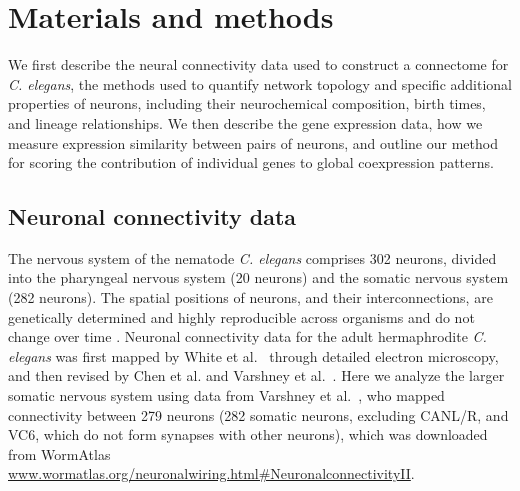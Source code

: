 \documentclass[10pt,letterpaper]{article}
\begin{document}
\section*{Materials and methods}

We first describe the neural connectivity data used to construct a connectome for \textit{C. elegans}, the methods used to quantify network topology and specific additional properties of neurons, including their neurochemical composition, birth times, and lineage relationships.
We then describe the gene expression data, how we measure expression similarity between pairs of neurons, and outline our method for scoring the contribution of individual genes to global coexpression patterns.


\subsection*{Neuronal connectivity data}
The nervous system of the nematode \emph{C. elegans} comprises 302 neurons, divided into the pharyngeal nervous system (20 neurons) and the somatic nervous system (282 neurons).
The spatial positions of neurons, and their interconnections, are genetically determined and highly reproducible across organisms \cite{Riddle1997} and do not change over time \cite{Schnabel1997}.
Neuronal connectivity data for the adult hermaphrodite \emph{C. elegans} was first mapped by White et al.~\cite{White:1986tx} through detailed electron microscopy, and then revised by Chen et al. \cite{Chen:2006ie} and Varshney et al.~\cite{Varshney2011}.
Here we analyze the larger somatic nervous system using data from Varshney et al.~\cite{Varshney2011}, who mapped connectivity between 279 neurons (282 somatic neurons, excluding CANL/R, and VC6, which do not form synapses with other neurons), which was downloaded from WormAtlas \cite{WormAtlas} \url{www.wormatlas.org/neuronalwiring.html#NeuronalconnectivityII}.
\end{document}

